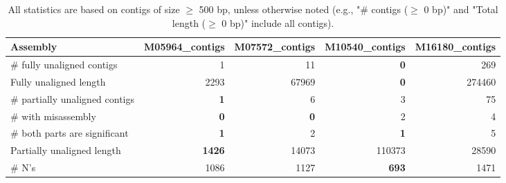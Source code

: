 \documentclass[12pt,a4paper]{article}
\begin{document}
\begin{table}[ht]
\begin{center}
\caption{All statistics are based on contigs of size $\geq$ 500 bp, unless otherwise noted (e.g., "\# contigs ($\geq$ 0 bp)" and "Total length ($\geq$ 0 bp)" include all contigs).}
\begin{tabular}{|l*{4}{|r}|}
\hline
Assembly & M05964\_contigs & M07572\_contigs & M10540\_contigs & M16180\_contigs \\ \hline
\# fully unaligned contigs & 1 & 11 & {\bf 0} & 269 \\ \hline
Fully unaligned length & 2293 & 67969 & {\bf 0} & 274460 \\ \hline
\# partially unaligned contigs & {\bf 1} & 6 & 3 & 75 \\ \hline
\hspace{5mm}\# with misassembly & {\bf 0} & {\bf 0} & 2 & 4 \\ \hline
\hspace{5mm}\# both parts are significant & {\bf 1} & 2 & {\bf 1} & 5 \\ \hline
Partially unaligned length & {\bf 1426} & 14073 & 110373 & 28590 \\ \hline
\# N's & 1086 & 1127 & {\bf 693} & 1471 \\ \hline
\end{tabular}
\end{center}
\end{table}
\end{document}
